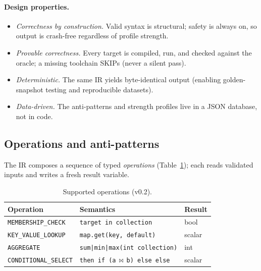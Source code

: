 \paragraph{Design properties.}
\begin{itemize}
  \item \emph{Correctness by construction.} Valid syntax is structural; safety is always
        on, so output is crash-free regardless of profile strength.
  \item \emph{Provable correctness.} Every target is compiled, run, and checked against
        the oracle; a missing toolchain \textsf{SKIP}s (never a silent pass).
  \item \emph{Deterministic.} The same IR yields byte-identical output (enabling
        golden-snapshot testing and reproducible datasets).
  \item \emph{Data-driven.} The anti-patterns and strength profiles live in a JSON
        database, not in code.
\end{itemize}

\subsection{Operations and anti-patterns}
\label{sec:ops}
The IR composes a sequence of typed \emph{operations} (Table~\ref{tab:ops}); each reads
validated inputs and writes a fresh result variable.

\begin{table}[t]
\centering
\caption{Supported operations (v0.2).}
\label{tab:ops}
\begin{tabular}{@{}lll@{}}
\toprule
Operation & Semantics & Result \\
\midrule
\texttt{MEMBERSHIP\_CHECK}   & \texttt{target in collection}              & bool \\
\texttt{KEY\_VALUE\_LOOKUP}  & \texttt{map.get(key, default)}             & scalar \\
\texttt{AGGREGATE}           & \texttt{sum|min|max(int collection)}       & int \\
\texttt{CONDITIONAL\_SELECT} & \texttt{then if (a$\,\bowtie\,$b) else else}& scalar \\
\bottomrule
\end{tabular}
\end{table}

